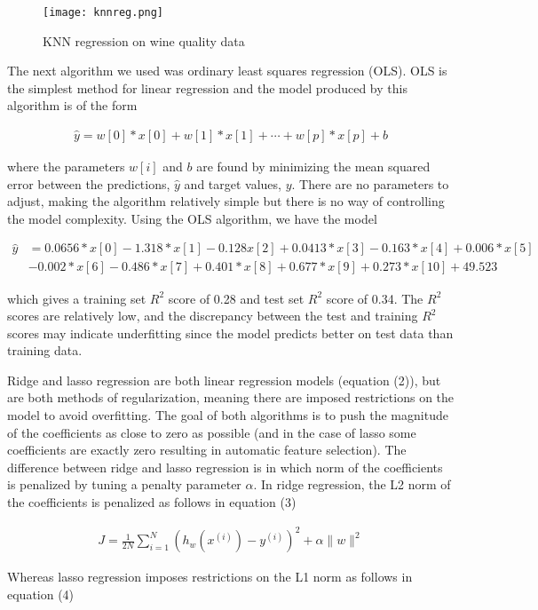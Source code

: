 \documentclass[12pt,letterpaper]{article}
\begin{document}
\begin{figure}[h]
	\centering
	\texttt{[image: knnreg.png]}
	\caption{KNN regression on wine quality data}
\end{figure}

The next algorithm we used was ordinary least squares regression (OLS). OLS is the simplest method for linear regression and the model produced by this algorithm is of the form 

\begin{align}
	\hat{y}=w[0]*x[0]+w[1]*x[1]+\cdots+w[p]*x[p]+b
\end{align} 

where the parameters $ w[i] $ and $ b $ are found by minimizing the mean squared error between the predictions, $\hat{y}$ and target values, $y$. There are no parameters to adjust, making the algorithm relatively simple but there is no way of controlling the model complexity. Using the OLS algorithm, we have the model

\begin{align*}
\hat{y}&=0.0656*x[0] -1.318*x[1] -0.128x[2] + 0.0413*x[3]-0.163*x[4]  +0.006*x[5] \\&-0.002*x[6] -0.486*x[7]+0.401*x[8]+  0.677*x[9] + 0.273*x[10] +49.523
\end{align*}

which gives a training set $R^2$ score of 0.28 and test set $R^2$ score of 0.34. The $R^2$ scores are relatively low, and the discrepancy between the test and training $R^2$ scores may indicate underfitting since the model predicts better on test data than training data.

Ridge and lasso regression are both linear regression models (equation (2)), but are both methods of regularization, meaning there are imposed restrictions on the model to avoid overfitting. The goal of both algorithms is to push the magnitude of the coefficients as close to zero as possible (and in the case of lasso some coefficients are exactly zero resulting in automatic feature selection). The difference between ridge and lasso regression is in which norm of the coefficients is penalized by tuning a penalty parameter $\alpha$. In ridge regression, the L2 norm of the coefficients is penalized as follows in equation (3)

\begin{align}
	J=\frac{1}{2N}\sum_{i=1}^{N}(h_w(x^{(i)})-y^{(i)})^2+\alpha\|w\|^2
\end{align}

Whereas lasso regression imposes restrictions on the L1 norm as follows in equation (4)
\end{document}

